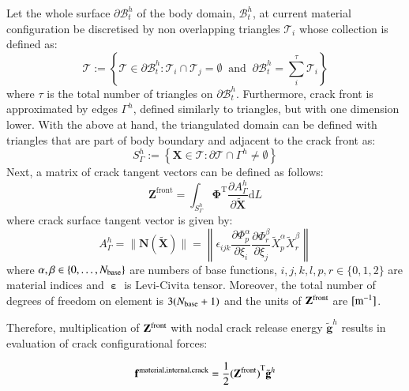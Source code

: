 \documentclass[11pt]{acmeArticle}
\numberwithin{equation}{section}
\begin{document}
Let the whole surface ${\partial\mathcal{B}^h_t}$ of the body domain, ${\mathcal{B}^h_t}$, at current material
configuration be discretised by non overlapping triangles $\mathcal{T}_i$ whose collection is defined as:
\begin{equation}
	\mathcal{T} := \left\{ 
		\mathcal{T} \in {\partial\mathcal{B}^h_t} : 
		\mathcal{T}_i \cap \mathcal{T}_j  = \emptyset \;\;
		\textrm{and}\;\;
		{\partial\mathcal{B}^h_t} = \sum_i^\tau \mathcal{T}_i 
	\right\}
\end{equation}
where $\tau$ is the total number of triangles on ${\partial\mathcal{B}^h_t}$.
Furthermore, crack front is approximated by edges $\Gamma^h$, defined similarly to
triangles, but with one dimension lower. With the above at hand, the triangulated domain can be defined with triangles that are part of body boundary and
adjacent to the crack front as:
\begin{equation}
 S^h_\Gamma :=
 \left\{
	 \mathbf{X} \in \mathcal{T}
	 : \partial \mathcal{T} \cap \Gamma^h \neq \emptyset
 \right\}
\end{equation}
Next, a matrix of crack tangent vectors can be defined as follows:
\begin{equation}
\mathbf{Z}^\textrm{front} = 
\int_{S^h_\Gamma}
\pmb{\Phi}^\textrm{T} 
\frac{\partial {A}^h_{\Gamma}}{
\partial \tilde{\mathbf{X}}}
\textrm{d}L
\end{equation}
where crack surface tangent vector is given by:
\begin{equation}
A^h_{\Gamma} = 	
	\| \mathbf{N}(\tilde{\mathbf{X}}) \|
=
\left\| 
\epsilon_{ijk}
\frac{\partial \Phi^\alpha_p}{\partial \xi_i}  
\frac{\partial \Phi^\beta_r}{\partial \xi_j} 
\tilde{X}^\alpha_p
\tilde{X}^\beta_r
\right\|
\end{equation}
where $\alpha, \beta \in \{0, \dots, N_{\rm{base}}\}$ are numbers of base functions,
$i,j,k,l,p,r \in \{0,1,2\}$ are material indices and $\boldsymbol{\upepsilon}$ is Levi-Civita tensor. 
Moreover, the total number of degrees of freedom on element is $3(N_{\rm{base}}+1)$ and the units of $\mathbf{Z}^{\rm{front}}$ are $[{\rm m}^{-1}]$.

Therefore, multiplication of $\mathbf{Z}^{\rm{front}}$ with nodal crack release energy ${\tilde{\mathbf{g}}}^h$ results in
evaluation of crack configurational forces:


\begin{equation}
\mathbf{f}^\textrm{material,internal,crack}	= \dfrac{1}{2} {(\mathbf{Z}^\textrm{front})}^{\rm{T}} {\tilde{\mathbf{g}}}^h 
	\label{eq:mat_int_crack}
\end{equation}
\end{document}
